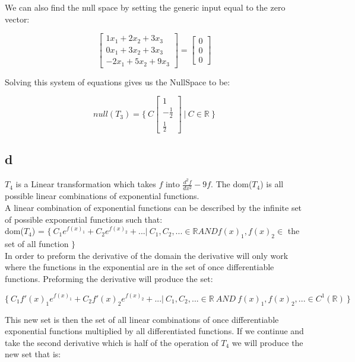 \documentclass[12pt]{article}
\begin{document}
We can also find the null space by setting the generic input equal to the zero vector:

\[
\begin{bmatrix}
1x_{1} + 2x_{2} + 3x_{3}\\
0x_{1} + 3x_{2} + 3x_{3}\\
-2x_{1}+ 5x_{2} + 9x_{3}
\end{bmatrix}
=
\begin{bmatrix}
0\\
0\\
0
\end{bmatrix}
\]

Solving this system of equations gives us the NullSpace to be:

\[
null(T_{3}) = 
\{ \
C
\begin{bmatrix}
1\\
-\frac{1}{2}\\
\frac{1}{2}
\end{bmatrix}
\ | \ 
C \in \mathbb{R} \ \}
\]


\subsection*{d}

$T_{4}$ is a Linear transformation which takes $f$ into $\frac{d^{2}f}{dx^{2}} - 9f$. The dom($T_{4}$) is all possible linear combinations of exponential functions.\\

A linear combination of exponential functions can be described by the infinite set of possible exponential functions such that:\\

dom($T_{4}$) = $ \{\ C_1 e^{f(x)_1} + C_2 e^{f(x)_2} + ...|\ C_1 , C_2, ... \in \mathbb{R} AND f(x)_1 , f(x)_2 \in$ the set of all function $\}$\\

In order to preform the derivative of the domain the derivative will only work where the functions in the exponential are in the set of once differentiable functions. Preforming the derivative will produce the set:

$$\{\ C_1 f'(x)_1 e^{f(x)_1} + C_2 f'(x)_2 e^{f(x)_2} + ... |\ C_1 , C_2 , ... \in \mathbb{R}\ AND\ f(x)_1 , f(x)_2 , ... \in C^{1}(\mathbb{R})  \ \}$$

This new set is then the set of all linear combinations of once differentiable exponential functions multiplied by all differentiated functions. If we continue and take the second derivative which is half of the operation of $T_4$ we will produce the new set that is:
\end{document}
